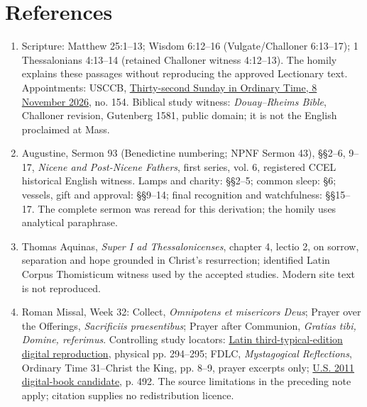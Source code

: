 \section{References}
\begin{enumerate}
\item Scripture: Matthew 25:1--13; Wisdom 6:12--16 (Vulgate/Challoner 6:13--17); 1 Thessalonians 4:13--14 (retained Challoner witness 4:12--13). The homily explains these passages without reproducing the approved Lectionary text. Appointments: USCCB, \href{https://bible.usccb.org/bible/readings/110826.cfm}{Thirty-second Sunday in Ordinary Time, 8 November 2026}, no. 154. Biblical study witness: \textit{Douay--Rheims Bible}, Challoner revision, Gutenberg 1581, public domain; it is not the English proclaimed at Mass.
\item Augustine, Sermon 93 (Benedictine numbering; NPNF Sermon 43), §§2--6, 9--17, \textit{Nicene and Post-Nicene Fathers}, first series, vol. 6, registered CCEL historical English witness. Lamps and charity: §§2--5; common sleep: §6; vessels, gift and approval: §§9--14; final recognition and watchfulness: §§15--17. The complete sermon was reread for this derivation; the homily uses analytical paraphrase.
\item Thomas Aquinas, \textit{Super I ad Thessalonicenses}, chapter 4, lectio 2, on sorrow, separation and hope grounded in Christ's resurrection; identified Latin Corpus Thomisticum witness used by the accepted studies. Modern site text is not reproduced.
\item Roman Missal, Week 32: Collect, \textit{Omnipotens et misericors Deus}; Prayer over the Offerings, \textit{Sacrificiis praesentibus}; Prayer after Communion, \textit{Gratias tibi, Domine, referimus}. Controlling study locators: \href{https://media.musicasacra.com/books/latin_missal2002.pdf}{Latin third-typical-edition digital reproduction}, physical pp. 294--295; FDLC, \textit{Mystagogical Reflections}, Ordinary Time 31--Christ the King, pp. 8--9, prayer excerpts only; \href{https://archive.org/download/Roman-Missal-Third-Edition/Roman\%20Missal.pdf}{U.S. 2011 digital-book candidate}, p. 492. The source limitations in the preceding note apply; citation supplies no redistribution licence.
\end{enumerate}
